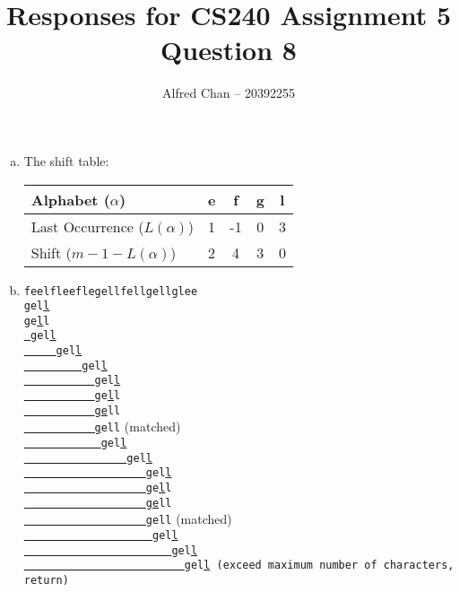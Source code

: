 \documentclass[12pt]{article}
\title{Responses for CS240 Assignment 5 Question 8}
\author{Alfred Chan -- 20392255}
\begin{document}
\maketitle

\begin{enumerate}[(a)]
\item
The shift table:\\
\begin{tabular}{|l|c|c|c|c|}
\hline
Alphabet ($\alpha$) & e & f & g & l\\\hline
Last Occurrence ($L(\alpha)$) & 1 & -1 & 0 & 3\\\hline
Shift ($m-1-L(\alpha)$) & 2 & 4 & 3 & 0\\\hline
\end{tabular}
\item
\verb+feelfleeflegellfellgellglee+\\
\texttt{gel\underline{l}}\\
\texttt{ge\underline{l}l}\\
\texttt{\underline{\ }gel\underline{l}}\\
\texttt{\underline{\ \ \ \ \ }gel\underline{l}}\\
\texttt{\underline{\ \ \ \ \ \ \ \ \ }gel\underline{l}}\\
\texttt{\underline{\ \ \ \ \ \ \ \ \ \ \ }gel\underline{l}}\\
\texttt{\underline{\ \ \ \ \ \ \ \ \ \ \ }ge\underline{l}l}\\
\texttt{\underline{\ \ \ \ \ \ \ \ \ \ \ }g\underline{e}ll}\\
\texttt{\underline{\ \ \ \ \ \ \ \ \ \ \ }\underline{g}ell} \hfill (matched)\\
\texttt{\underline{\ \ \ \ \ \ \ \ \ \ \ \ }gel\underline{l}}\\
\texttt{\underline{\ \ \ \ \ \ \ \ \ \ \ \ \ \ \ \ }gel\underline{l}}\\
\texttt{\underline{\ \ \ \ \ \ \ \ \ \ \ \ \ \ \ \ \ \ \ }gel\underline{l}}\\
\texttt{\underline{\ \ \ \ \ \ \ \ \ \ \ \ \ \ \ \ \ \ \ }ge\underline{l}l}\\
\texttt{\underline{\ \ \ \ \ \ \ \ \ \ \ \ \ \ \ \ \ \ \ }g\underline{e}ll}\\
\texttt{\underline{\ \ \ \ \ \ \ \ \ \ \ \ \ \ \ \ \ \ \ }\underline{g}ell} \hfill(matched)\\
\texttt{\underline{\ \ \ \ \ \ \ \ \ \ \ \ \ \ \ \ \ \ \ \ }gel\underline{l}}\\
\texttt{\underline{\ \ \ \ \ \ \ \ \ \ \ \ \ \ \ \ \ \ \ \ \ \ \ }gel\underline{l}}\\
\texttt{\underline{\ \ \ \ \ \ \ \ \ \ \ \ \ \ \ \ \ \ \ \ \ \ \ \ \ }gel\underline{l} (exceed maximum number of characters, return)}\\
\end{enumerate}
\done
\end{document}
